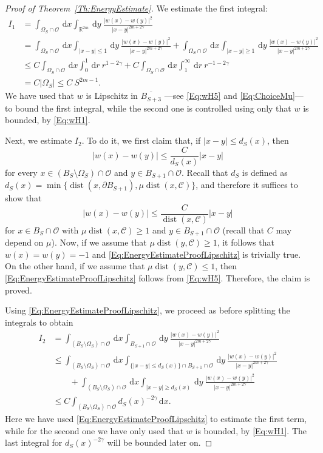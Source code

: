 \documentclass[12pt,reqno]{amsart}
\theoremstyle{definition}
\theoremstyle{remark}
\newcommand{\con}[1]{\mathbb{#1}}
\newcommand{\R}{\con{R}} %
\newcommand{\ccal}{\mathscr{C}}
\newcommand{\ocal}{\mathcal{O}}
\newcommand{\s}{\gamma}
\renewcommand{\d}{\,\mathrm{d}} %
\DeclareMathOperator{\dist}{dist}
\numberwithin{equation}{section}
\begin{document}
\begin{proof}[Proof of Theorem~\ref{Th:EnergyEstimate}]
		We estimate the first integral:
		\begin{align*}
		I_1 &= \int_{\Omega_{S}\cap \ocal} \d x \int_{\R^{2m}} \d y \  \frac{|w(x)-w(y)|^2}{|x-y|^{2m+2\s}} \\
		&= \int_{\Omega_{S}\cap \ocal} \d x \int_{|x-y|\leq 1} \d y \ \frac{|w(x)-w(y)|^2}{|x-y|^{2m+2\s}} + \int_{\Omega_{S}\cap \ocal} \d x \int_{|x-y|\geq 1} \d y \ \frac{|w(x)-w(y)|^2}{|x-y|^{2m+2\s}} \\
		&\leq C \int_{\Omega_{S}\cap \ocal} \d x \int_0^1 \d r \ r^{1-2\s} + C \int_{\Omega_{S}\cap \ocal} \d x \int_1^\infty \d r \ r^{-1-2\s} \\
		&= C |\Omega_S| \leq C \ S^{2m-1}.
		\end{align*}
		We have used that $w$ is Lipschitz in $\overline{B_{S+3}}$ ---see \eqref{Eq:wH5} and \eqref{Eq:ChoiceMu}--- to bound the first integral, while the second one is controlled using only that $w$ is bounded, by \eqref{Eq:wH1}. 
		
		Next, we estimate $I_2$. To do it, we first claim that, if $|x-y|\leq d_S(x)$, then
		\begin{equation}
		\label{Eq:EnergyEstimateProofLipschitz}
		|w(x)-w(y)| \leq \dfrac{C}{d_S(x)} |x-y|	
		\end{equation}
		for every $x\in (B_S\setminus \Omega_S)\cap \ocal$ and $y \in B_{S+1}\cap \ocal$. Recall that $d_S$ is defined as $d_S(x)=\min \{\dist(x,\partial B_{S+1}) , \mu \dist (x, \ccal)\}$, and therefore it suffices to show that
		$$
		|w(x)-w(y)| \leq \dfrac{C}{\dist (x, \ccal)} |x-y|
		$$
		for $x\in B_S \cap \ocal$ with $\mu \dist (x, \ccal) \geq 1$ and $y \in B_{S+1}\cap \ocal$ (recall that $C$ may depend on $\mu$). Now, if we assume that $\mu \dist (y, \ccal) \geq 1$, it follows that $w(x)=w(y)=-1$ and \eqref{Eq:EnergyEstimateProofLipschitz} is trivially true. On the other hand, if we assume that $\mu \dist (y, \ccal) \leq 1$, then \eqref{Eq:EnergyEstimateProofLipschitz} follows from \eqref{Eq:wH5}. Therefore, the claim is proved.
		
		Using \eqref{Eq:EnergyEstimateProofLipschitz}, we proceed as before splitting the integrals to obtain
		\begin{align*}
		I_2 &= \int_{(B_S\setminus \Omega_S)\cap \ocal} \d x \int_{B_{S+1}\cap \ocal} \d y \  \frac{|w(x)-w(y)|^2}{|x-y|^{2m+2\s}}   \\
		&\leq \int_{(B_S\setminus \Omega_S)\cap \ocal} \d x \int_{ \{|x-y|\leq d_S(x)\} \cap B_{S+1}\cap \ocal} \d y \  \frac{|w(x)-w(y)|^2}{|x-y|^{2m+2\s}} \\
		& \quad \quad + \int_{(B_S\setminus \Omega_S)\cap \ocal} \d x \int_{|x-y|\geq d_S(x)} \d y \ \frac{|w(x)-w(y)|^2}{|x-y|^{2m+2\s}} \\
		&\leq C \int_{(B_S\setminus \Omega_S)\cap \ocal} d_S(x)^{-2\s} \d x .
		\end{align*}
		Here we have used \eqref{Eq:EnergyEstimateProofLipschitz} to estimate the first term, while for the second one we have only used that $w$ is bounded, by \eqref{Eq:wH1}. The last integral for $d_S(x)^{-2\s}$ will be bounded later on.
		

\end{proof}
\end{document}
